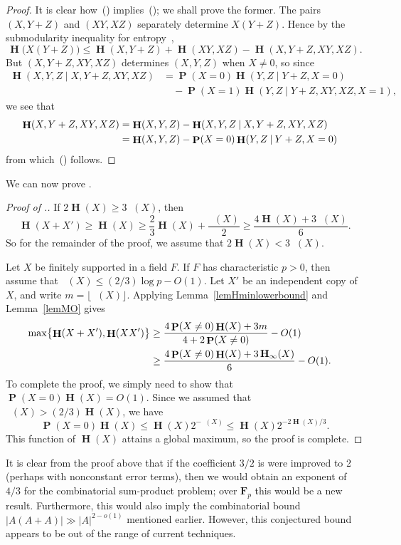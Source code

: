 \documentclass[twoside, 10pt]{article}
\renewcommand{\eqref}[1]{\textup{{\normalfont(\oldstylenums{\ref{#1}}}\normalfont)}}
\newcommand\FF{{\mathbf{F}}}
\DeclareMathOperator{\Eta}{\mathbf{H}}
\DeclareMathOperator{\Etamin}{\mathbf{H}_\infty}
\DeclareMathOperator{\pr}{\mathbf{P}}
\newcommand\given{\mathbin{|}}
\begin{document}
\begin{proof}
It is clear how~\eqref{eqMOone} implies~\eqref{eqMOtwo}; 
we shall prove the former.
The pairs $(X,Y+Z)$ and $(XY, XZ)$ separately determine $X(Y+Z)$. Hence by the submodularity inequality for entropy~\cite{tao2010},
\[\Eta\bigl(X(Y+Z)\bigr)
\le \Eta(X, Y+Z) + \Eta(XY, XZ) - \Eta(X,Y+Z,XY,XZ).\]
But $(X,Y+Z,XY,XZ)$ determines $(X,Y,Z)$ when $X\ne 0$,
so since 
\begin{align*}
\Eta(X,Y,Z \given X,Y+Z,XY,XZ) &= \pr(X=0) \Eta(Y,Z\given Y+Z, X=0)  \\
& \quad - \pr(X=1) \Eta(Y,Z\given Y+Z,XY,XZ, X=1),
\end{align*}
we see that
\begin{align}
\Eta(X,Y+Z,XY,XZ)
&= \Eta(X,Y,Z) - \Eta(X,Y,Z \given X,Y+Z,XY,XZ) \cr
&= \Eta(X,Y,Z) - \pr(X=0) \Eta(Y,Z\given Y+Z, X=0) \cr
\end{align}
from which~\eqref{eqMOone} follows.
\end{proof}

We can now prove .

\begin{proof}[Proof of .]
If $2\Eta(X)\ge 3\Etamin(X)$, then
$$\Eta(X+X')\ge \Eta(X) \ge \frac23\Eta(X)
+ \frac{\Etamin(X)}{2}\ge \frac{4 \Eta(X) + 3\Etamin(X)}{6}.$$
So for the remainder of the proof, we assume that $2\Eta(X) < 3\Etamin(X)$. 

Let $X$ be finitely supported in a field $F$. If $F$ has characteristic $p>0$, then assume that $\Etamin(X) \le (2/3)\log p - O(1)$. 
Let $X'$ be an independent copy of $X$, 
and write $m = \lfloor \Etamin(X)\rfloor$. 
Applying Lemma~\ref{lemHminlowerbound} and
Lemma~\ref{lemMO} gives
\begin{align}
\max\bigl\{ \Eta(X+X'), \Eta(XX') \bigr\}
&\ge
\frac{4\pr(X\ne 0)\Eta(X)+3m}
     {4+2\pr(X\ne 0)}
-O(1) \cr
&\ge
\frac{4\pr(X\ne 0)\Eta(X)+3\Etamin(X)}{6}
-O(1).
\end{align}
To complete the proof, we simply need to show that
$\pr(X=0)\Eta(X) = O(1)$. Since we assumed that $\Etamin(X) > (2/3)\Eta(X)$, we have
\[
\pr(X=0)\Eta(X)
\le \Eta(X)2^{-\Etamin(X)}
\le \Eta(X)2^{-2\Eta(X)/3}.
\]
This function of $\Eta(X)$ attains a global maximum, so the proof is complete.
\end{proof}

It is clear from the proof above that if the 
coefficient $3/2$ is  were improved to 2
(perhaps with nonconstant error terms), then we would obtain an exponent 
of $4/3$ for the combinatorial sum-product problem; over $\FF_p$ this 
would be a new result. Furthermore, this would also imply the
combinatorial bound $\bigl|A(A+A)\bigr| \gg |A|^{2-o(1)}$
mentioned earlier. However, this conjectured bound appears to be
out of the range of current techniques.
\end{document}
